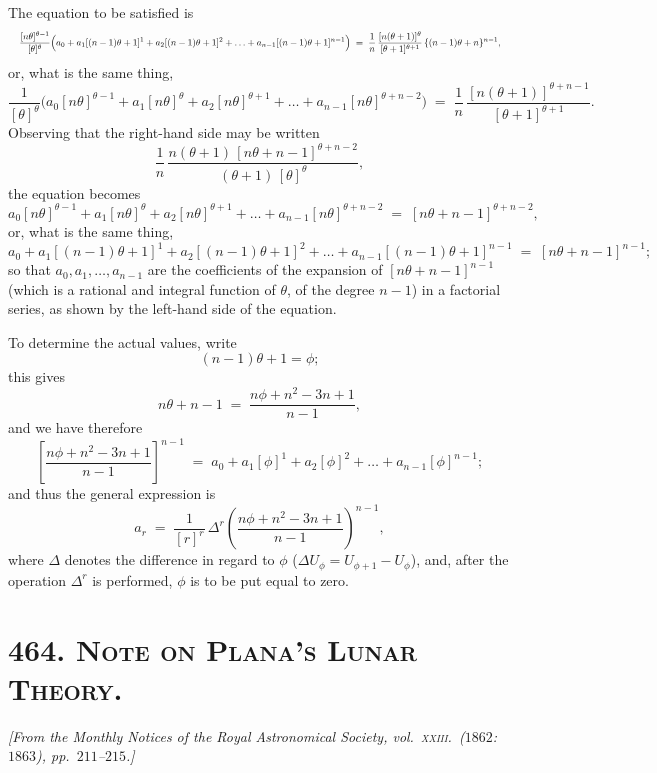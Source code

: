 \documentclass[11pt]{article}
\begin{document}
The equation to be satisfied is
\[
\resizebox{\textwidth}{!}{$\displaystyle
\frac{[n\theta]^{\theta-1}}{[\theta]^{\theta}}
\Big( a_{0} + a_{1}[(n-1)\theta + 1]^{1} + a_{2}[(n-1)\theta+1]^{2}
+ \ldots + a_{n-1}[(n-1)\theta+1]^{n-1} \Big)
\;=\; \frac{1}{n}\,\frac{[n(\theta+1)]^{\theta}}{[\theta+1]^{\theta+1}}\,
\{(n-1)\theta + n\}^{n-1},
$}\]
or, what is the same thing,
\[
\frac{1}{[\theta]^{\theta}}\Big( a_{0}[n\theta]^{\theta-1}
+ a_{1}[n\theta]^{\theta} + a_{2}[n\theta]^{\theta+1}
+ \ldots + a_{n-1}[n\theta]^{\theta+n-2} \Big)
\;=\; \frac{1}{n}\,\frac{[n(\theta+1)]^{\theta+n-1}}{[\theta+1]^{\theta+1}}.
\]
Observing that the right-hand side may be written
\[
\frac{1}{n}\,\frac{n(\theta+1)\,[n\theta + n - 1]^{\theta+n-2}}{(\theta+1)\,[\theta]^{\theta}},
\]
the equation becomes
\[
a_{0}[n\theta]^{\theta-1} + a_{1}[n\theta]^{\theta}
+ a_{2}[n\theta]^{\theta+1} + \ldots
+ a_{n-1}[n\theta]^{\theta+n-2}
\;=\; [n\theta + n - 1]^{\theta+n-2},
\]
or, what is the same thing,
\[
a_{0} + a_{1}[(n-1)\theta + 1]^{1}
+ a_{2}[(n-1)\theta + 1]^{2} + \ldots
+ a_{n-1}[(n-1)\theta + 1]^{n-1}
\;=\; [n\theta + n - 1]^{n-1};
\]
so that $a_{0}, a_{1}, \ldots, a_{n-1}$ are the coefficients of the
expansion of $[n\theta + n - 1]^{n-1}$ (which is a rational and
integral function of $\theta$, of the degree $n-1$) in a factorial
series, as shown by the left-hand side of the equation.

To determine the actual values, write
\[
(n-1)\theta + 1 = \phi;
\]
this gives
\[
n\theta + n - 1 \;=\; \frac{n\phi + n^{2} - 3n + 1}{n - 1},
\]
and we have therefore
\[
\left[\frac{n\phi + n^{2} - 3n + 1}{n - 1}\right]^{n-1}
\;=\; a_{0} + a_{1}[\phi]^{1} + a_{2}[\phi]^{2}
+ \ldots + a_{n-1}[\phi]^{n-1};
\]
and thus the general expression is
\[
a_{r} \;=\; \frac{1}{[r]^{r}}\,
\Delta^{r}\!\left(\frac{n\phi + n^{2} - 3n + 1}{n - 1}\right)^{\!n-1},
\]
where $\Delta$ denotes the difference in regard to $\phi$
($\Delta U_{\phi} = U_{\phi+1} - U_{\phi}$), and, after the operation
$\Delta^{r}$ is performed, $\phi$ is to be put equal to zero.

\section*{464. \textsc{Note on Plana's Lunar Theory.}}

\begin{center}
\textit{[From the Monthly Notices of the Royal Astronomical Society,
vol.\ \textsc{xxiii}.\ ($1862$:$1863$), pp.\ $211$--$215$.]}
\end{center}
\end{document}

